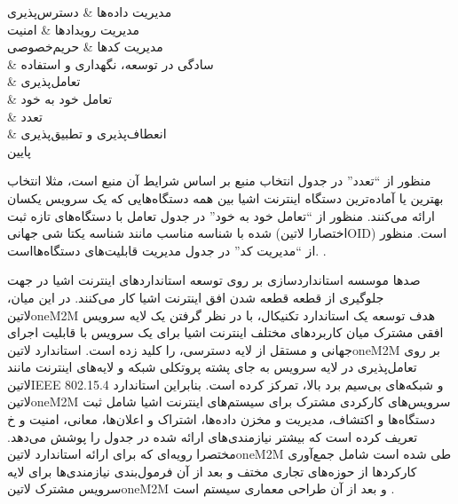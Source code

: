مدیریت داده‌ها &
دسترس‌پذیری \\

مدیریت رویدادها &
امنیت \\

مدیریت کدها &
حریم‌خصوصی \\

&
سادگی در توسعه، نگهداری و استفاده \\

&
تعامل‌پذیری \\

&
تعامل خود به خود \\

&
تعدد \\

&
انعطاف‌پذیری و تطبیق‌پذیری \\

‌پایین



منظور از ``تعدد'' در جدول  انتخاب منبع بر اساس شرایط آن منبع است، مثلا
انتخاب بهترین یا آماده‌ترین دستگاه اینترنت اشیا بین همه دستگاه‌هایی که یک سرویس یکسان ارائه می‌کنند.
منظور از ``تعامل خود به خود'' در جدول 
تعامل با دستگاه‌های تازه ثبت شده با شناسه مناسب مانند شناسه یکتا شی جهانی (اختصارا ‌لاتین{OID}) است.
منظور از ``مدیریت کد'' در جدول 
مدیریت قابلیت‌های دستگاه‌ها‌است.
.

صدها موسسه استانداردسازی بر روی توسعه استانداردهای اینترنت اشیا در جهت جلوگیری از قطعه قطعه شدن افق اینترنت اشیا کار می‌کنند.
در این میان، ‌لاتین{oneM2M} هدف توسعه یک استاندارد تکنیکال، با در نظر گرفتن یک لایه سرویس افقی مشترک میان کاربردهای مختلف اینترنت اشیا برای
یک سرویس با قابلیت اجرای جهانی و مستقل از لایه دسترسی، را کلید زده است.
استاندارد ‌لاتین{oneM2M} بر روی تعامل‌پذیری در لایه سرویس به جای پشته پروتکلی شبکه و لایه‌های اینترنت مانند ‌لاتین{IEEE 802.15.4} و شبکه‌های بی‌سیم برد بالا، تمرکز کرده است.
بنابراین استاندارد ‌لاتین{oneM2M} سرویس‌های کارکردی مشترک برای سیستم‌های اینترنت اشیا شامل ثبت دستگاه‌ها و اکتشاف، مدیریت و مخزن داده‌ها، اشتراک و اعلان‌ها، معانی، امنیت و ‌خ
تعریف کرده است که بیشتر نیازمندی‌های ارائه شده در جدول  را پوشش می‌دهد.
مختصرا رویه‌ای که برای ارائه استاندارد ‌لاتین{oneM2M} طی شده است شامل جمع‌آوری کارکردها از حوزه‌های تجاری مختف و بعد از آن
فرمول‌بندی نیازمندی‌ها برای لایه سرویس مشترک ‌لاتین{oneM2M} و بعد از آن طراحی معماری سیستم است
 .

